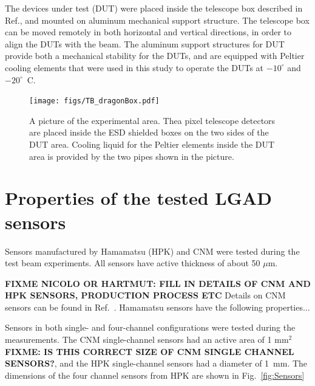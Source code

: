 \documentclass[preprint,1p]{elsarticle}
\begin{document}
The devices under test (DUT) were placed inside the telescope box described in
Ref.\cite{KWAN2016162}, and mounted on aluminum mechanical support structure.
The telescope box can be moved remotely in both horizontal and vertical
directions, in order to align the DUTs with the beam. The aluminum support
structures for DUT provide both a mechanical stability for the DUTs, and are
equipped with Peltier cooling elements that were used in this study to operate
the DUTs at $-10^{\circ}$ and $-20^{\circ}$~C.

\begin{figure}[htbp] 
\centering
\texttt{[image: figs/TB\_dragonBox.pdf]} 
\caption{A picture of the experimental area. Thea pixel telescope detectors are placed inside the ESD shielded boxes on the two sides of the DUT area. Cooling liquid for the Peltier elements inside the DUT area is provided by the two pipes shown in the picture.} 
\label{fig:DragonBox} 
\end{figure} 


\section{Properties of the tested LGAD sensors}

Sensors manufactured by Hamamatsu (HPK) and CNM were tested during the test beam
experiments. All sensors have active thickness of about 50 $\mu$m. 

{\bf FIXME NICOLO OR HARTMUT: FILL IN DETAILS OF CNM AND HPK SENSORS, PRODUCTION
PROCESS ETC} Details on CNM sensors can be found in Ref.~\cite{CNMSensors,
Cartiglia201783}. Hamamatsu sensors have the following properties... 

Sensors in both single- and four-channel configurations were tested during the
measurements. The CNM single-channel sensors had an active area of 1 mm$^2$ {\bf
FIXME: IS THIS CORRECT SIZE OF CNM SINGLE CHANNEL SENSORS?}, and the HPK
single-channel sensors had a diameter of 1~mm. The dimensions of the four
channel sensors from HPK are shown in Fig.~\ref{fig:Sensors}
\end{document}
